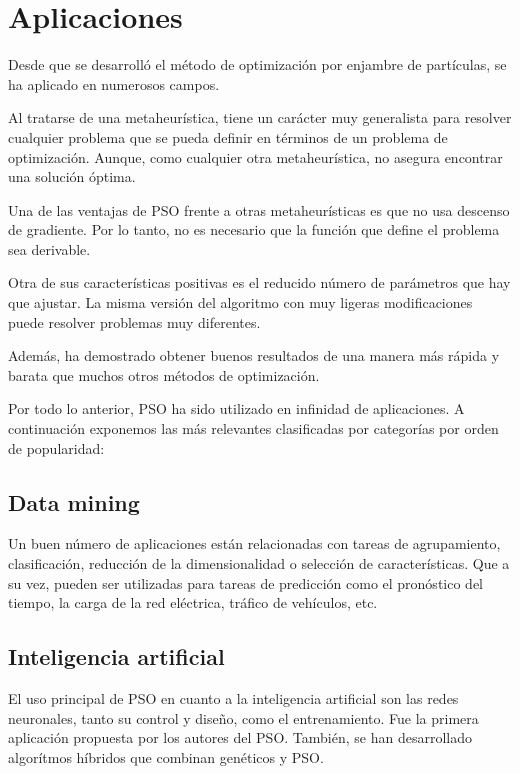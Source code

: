 \documentclass[a4paper,12pt,titlepage]{article}
\begin{document}
\section{Aplicaciones}

Desde que se desarrolló el método de optimización por enjambre de partículas, se ha aplicado en numerosos campos. 

Al tratarse de una metaheurística, tiene un carácter muy generalista para resolver cualquier problema que se pueda definir en términos de un problema de optimización. Aunque, como cualquier otra metaheurística, no asegura encontrar una solución óptima. 

Una de las ventajas de PSO frente a otras metaheurísticas es que no usa descenso de gradiente. Por lo tanto, no es necesario que la función que define el problema sea derivable.

Otra de sus características positivas es el reducido número de parámetros que hay que ajustar. La misma versión del algoritmo con muy ligeras modificaciones puede resolver problemas muy diferentes.

Además, ha demostrado obtener buenos resultados de una manera más rápida y barata que muchos otros métodos de optimización.

Por todo lo anterior, PSO ha sido utilizado en infinidad de aplicaciones. A continuación exponemos las más relevantes clasificadas por categorías por orden de popularidad: \citep{Poli2008,Zhang2015}

\subsection{Data mining}

Un buen número de aplicaciones están relacionadas con tareas de agrupamiento, clasificación, reducción de la dimensionalidad o selección de características. Que a su vez, pueden ser utilizadas para tareas de predicción como el pronóstico del tiempo, la carga de la red eléctrica, tráfico de vehículos, etc.

\subsection{Inteligencia artificial}

El uso principal de PSO en cuanto a la inteligencia artificial son las redes neuronales, tanto su control y diseño, como el entrenamiento. Fue la primera aplicación propuesta por los autores del PSO. También, se han desarrollado algorítmos híbridos que combinan genéticos y PSO.
\end{document}
